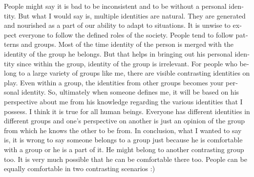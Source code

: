 \begin{english}
People might say it is bad to be inconsistent and to be without a personal identity. But what I would say is, 
multiple identities are natural. They are generated and nourished as a part of our ability to adapt to situations. 
It is unwise to expect everyone to follow the defined roles of the society. People tend to follow patterns and 
groups. Most of the time identity of the person is merged with the identity of the group he belongs. But that 
helps in bringing out his personal identity since within the group, identity of the group is irrelevant. For people 
who belong to a large variety of groups like me, there are visible contrasting identities on play. Even within a 
group, the identities from other groups becomes your personal identity. So, ultimately when someone defines me, 
it will be based on his perspective about me from his knowledge regarding the various identities that I possess. 
I think it is true for all human beings. Everyone has different identities in different groups and one's perspective on 
another is just an opinion of the group from which he knows the other to be from. In conclusion, what I wanted to 
say is, it is wrong to say someone belongs to a group just because he is comfortable with a group or he is a 
part of it. He might belong to another contrasting group too. It is very much possible that he can be comfortable 
there too. People can be equally comfortable in two contrasting scenarios :)
\end{english}
\newpage 
